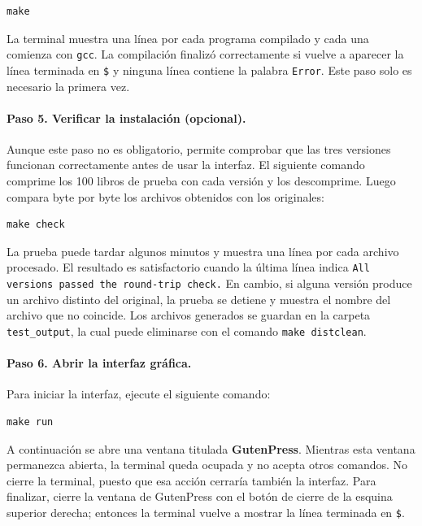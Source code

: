 \documentclass{report}
\begin{document}
\begin{lstlisting}[style=terminal]
make
\end{lstlisting}

La terminal muestra una línea por cada programa compilado y cada una comienza con \texttt{gcc}. La compilación finalizó correctamente si vuelve a aparecer la línea terminada en \texttt{\$} y ninguna línea contiene la palabra \texttt{Error}. Este paso solo es necesario la primera vez.

\paragraph{Paso 5. Verificar la instalación (opcional).} Aunque este paso no es obligatorio, permite comprobar que las tres versiones funcionan correctamente antes de usar la interfaz. El siguiente comando comprime los 100 libros de prueba con cada versión y los descomprime. Luego compara byte por byte los archivos obtenidos con los originales:

\begin{lstlisting}[style=terminal]
make check
\end{lstlisting}

La prueba puede tardar algunos minutos y muestra una línea por cada archivo procesado. El resultado es satisfactorio cuando la última línea indica \texttt{All versions passed the round-trip check.} En cambio, si alguna versión produce un archivo distinto del original, la prueba se detiene y muestra el nombre del archivo que no coincide. Los archivos generados se guardan en la carpeta \texttt{test\_output}, la cual puede eliminarse con el comando \texttt{make distclean}.

\paragraph{Paso 6. Abrir la interfaz gráfica.} Para iniciar la interfaz, ejecute el siguiente comando:

\begin{lstlisting}[style=terminal]
make run
\end{lstlisting}

A continuación se abre una ventana titulada \textbf{GutenPress}. Mientras esta ventana permanezca abierta, la terminal queda ocupada y no acepta otros comandos. No cierre la terminal, puesto que esa acción cerraría también la interfaz. Para finalizar, cierre la ventana de GutenPress con el botón de cierre de la esquina superior derecha; entonces la terminal vuelve a mostrar la línea terminada en \texttt{\$}.
\end{document}
